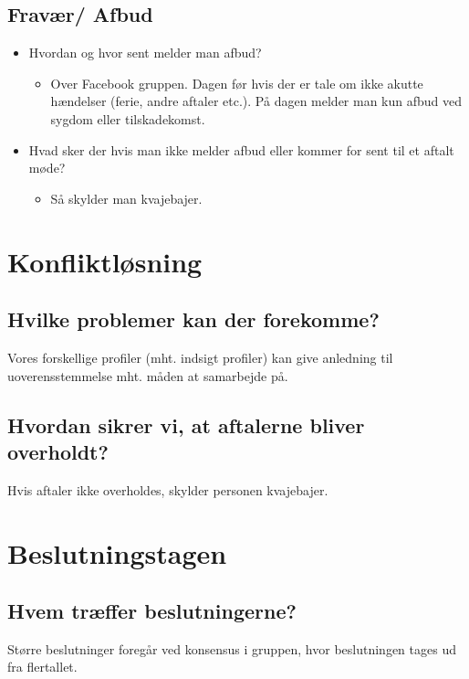 \documentclass[a4paper,12pt]{article}
\begin{document}
\subsection*{Fravær/ Afbud}
\begin{itemize}
    \item Hvordan og hvor sent melder man afbud? \\
    \begin{itemize}
        \item Over Facebook gruppen. Dagen før hvis der er tale om ikke akutte hændelser (ferie, andre aftaler etc.). På dagen melder man kun afbud ved sygdom eller tilskadekomst.\\
    \end{itemize}
    \item Hvad sker der hvis man ikke melder afbud eller kommer for sent til et aftalt møde? \\
    \begin{itemize}
        \item Så skylder man kvajebajer.
    \end{itemize}
\end{itemize}

\section*{Konfliktløsning}
\subsection*{Hvilke problemer kan der forekomme?}
Vores forskellige profiler (mht. indsigt profiler) kan give anledning til uoverensstemmelse mht. måden at samarbejde på.

\subsection*{Hvordan sikrer vi, at aftalerne bliver overholdt?}
Hvis aftaler ikke overholdes, skylder personen kvajebajer.

\section*{Beslutningstagen}
\subsection*{Hvem træffer beslutningerne?}
Større beslutninger foregår ved konsensus i gruppen, hvor beslutningen tages ud fra flertallet.
\end{document}
